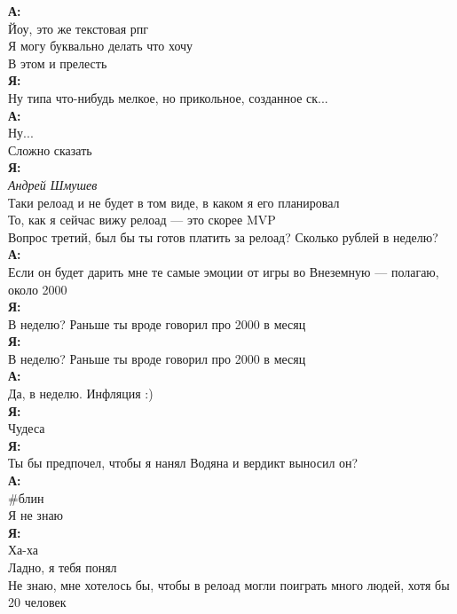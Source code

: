 \begin{tabbing}
\textbf{А:}\\
Йоу, это же текстовая рпг\\
Я могу буквально делать что хочу\\
В этом и прелесть\\

\textbf{Я:}\\
Ну типа что-нибудь мелкое, но прикольное, созданное ск...\\
\textbf{А:}\\
Ну...\\
Сложно сказать\\
\textbf{Я:}\\
\textit{Андрей Шмушев}\\
Таки релоад и не будет в том виде, в каком я его планировал\\
То, как я сейчас вижу релоад — это скорее MVP\\
Вопрос третий, был бы ты готов платить за релоад? Сколько рублей в неделю?\\

\textbf{А:}\\
Если он будет дарить мне те самые эмоции от игры во Внеземную — полагаю, около 2000\\

\textbf{Я:}\\
В неделю? Раньше ты вроде говорил про 2000 в месяц\\

\textbf{Я:}\\
В неделю? Раньше ты вроде говорил про 2000 в месяц\\
\textbf{А:}\\
Да, в неделю. Инфляция :)\\

\textbf{Я:}\\
Чудеса\\
\textbf{Я:}\\
Ты бы предпочел, чтобы я нанял Водяна и вердикт выносил он?\\

\textbf{А:}\\
\#блин\\
Я не знаю\\

\textbf{Я:}\\
Ха-ха\\
Ладно, я тебя понял\\
Не знаю, мне хотелось бы, чтобы в релоад могли поиграть много людей, хотя бы 20 человек\\


\end{tabbing}

